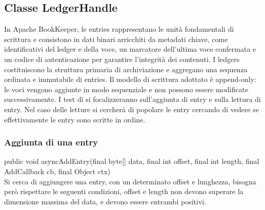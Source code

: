\documentclass[10pt]{article}
\begin{document}
{		\subsection{Classe LedgerHandle}
		In Apache BookKeeper, le entries rappresentano le unità fondamentali di scrittura e consistono in dati binari arricchiti da metadati chiave, come identificativi del ledger e della voce, un marcatore dell’ultima voce confermata e un codice di autenticazione per garantire l’integrità dei contenuti.
		I ledgers costituiscono la struttura primaria di archiviazione e aggregano una sequenza ordinata e immutabile di entries. Il modello di scrittura adottato è append-only: le voci vengono aggiunte in modo sequenziale e non possono essere modificate successivamente. I test di si focalizzeranno sull'aggiunta di entry e sulla lettura di entry. Nel caso delle letture si cercherà di popolare le entry cercando di vedere se effettivamente le entry sono scritte in ordine.
		\subsubsection{Aggiunta di una entry}
		public void asyncAddEntry(final byte[] data, final int offset, final int length,
		final AddCallback cb, final Object ctx)\\
		Si cerca di aggiungere una entry, con un determinato offset e lunghezza, bisogna però rispettare le seguenti condizioni, 
		offset e length non devono superare la dimensione massima del data, e devono essere entrambi positivi. 
		
}
\end{document}
